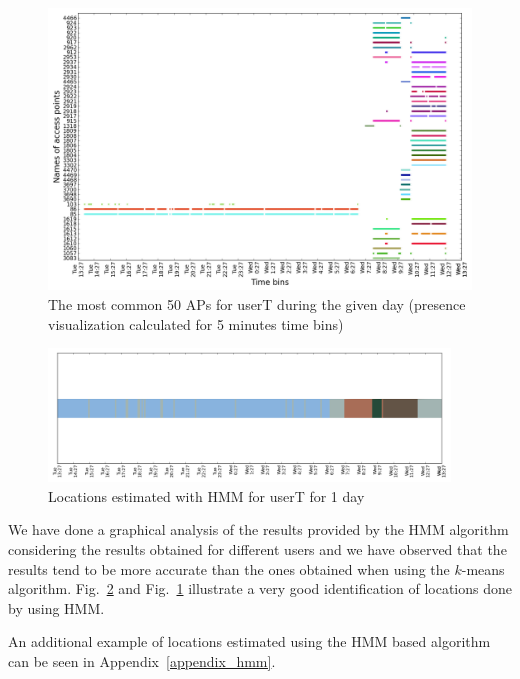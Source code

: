 \begin{figure}[!h]
\centering
\includegraphics[width=\textwidth]{figures/hmm/user_1_sorted_1days_no_rssi_plot.png}
\caption{The most common 50 APs for userT during the given day (presence
visualization calculated for 5 minutes time bins)}
\label{user_6_days1_2_3_APs_presence}
\end{figure}

\begin{figure}[!h]
\centering
\includegraphics[width=0.95\textwidth]{figures/hmm/user_1_hmm_locations_(5)_1days_plot.png}
\caption{Locations estimated with HMM for userT for 1 day}
\label{user_6_days1_2_3_hmm}
\end{figure}

We have done a graphical analysis of the results provided by the HMM algorithm
considering the results obtained for different users and we have observed that
the results tend to be more accurate than the ones obtained when using the
$k$-means algorithm. Fig.~\ref{user_6_days1_2_3_hmm} and
Fig.~\ref{user_6_days1_2_3_APs_presence} illustrate a very good identification
of locations done by using HMM.

An additional example of locations estimated using the HMM based algorithm can
be seen in Appendix~\ref{appendix_hmm}.